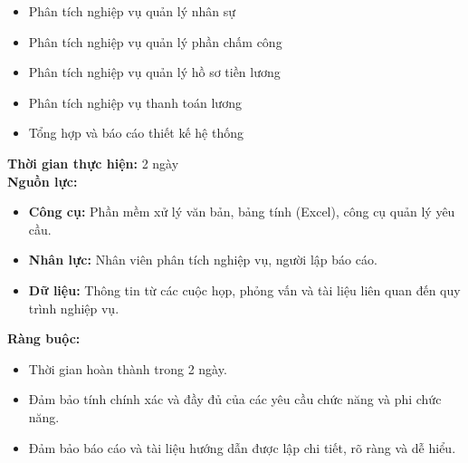 {\begin{minipage}{\textwidth}
\begin{itemize}
        \begin{itemize}
            \item Phân tích nghiệp vụ quản lý nhân sự
            \item Phân tích nghiệp vụ quản lý phần chấm công
            \item Phân tích nghiệp vụ quản lý hồ sơ tiền lương
            \item Phân tích nghiệp vụ thanh toán lương
            \item Tổng hợp và báo cáo thiết kế hệ thống
        \end{itemize}
    \end{itemize}
    \vspace{0.5cm}
    \noindent \textbf{Thời gian thực hiện:} 2 ngày \\
    \noindent \textbf{Nguồn lực:}
    \begin{itemize}
        \item \textbf{Công cụ:} Phần mềm xử lý văn bản, bảng tính (Excel), công cụ quản lý yêu cầu.
        \item \textbf{Nhân lực:} Nhân viên phân tích nghiệp vụ, người lập báo cáo.
        \item \textbf{Dữ liệu:} Thông tin từ các cuộc họp, phỏng vấn và tài liệu liên quan đến quy trình nghiệp vụ.
    \end{itemize}
    \vspace{0.5cm}
    \noindent \textbf{Ràng buộc:}
    \begin{itemize}
        \item Thời gian hoàn thành trong 2 ngày.
        \item Đảm bảo tính chính xác và đầy đủ của các yêu cầu chức năng và phi chức năng.
        \item Đảm bảo báo cáo và tài liệu hướng dẫn được lập chi tiết, rõ ràng và dễ hiểu.
    \end{itemize}
    \end{minipage}
}

\newpage %

